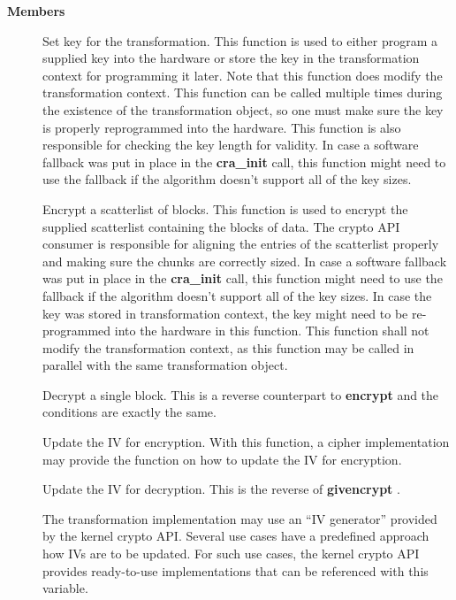 \documentclass[a4paper,8pt,english]{sphinxmanual}
\begin{document}
\textbf{Members}
\begin{description}
\item[{}] \leavevmode
Set key for the transformation. This function is used to either
program a supplied key into the hardware or store the key in the
transformation context for programming it later. Note that this
function does modify the transformation context. This function can
be called multiple times during the existence of the transformation
object, so one must make sure the key is properly reprogrammed into
the hardware. This function is also responsible for checking the key
length for validity. In case a software fallback was put in place in
the \textbf{cra\_init} call, this function might need to use the fallback if
the algorithm doesn't support all of the key sizes.

\item[{}] \leavevmode
Encrypt a scatterlist of blocks. This function is used to encrypt
the supplied scatterlist containing the blocks of data. The crypto
API consumer is responsible for aligning the entries of the
scatterlist properly and making sure the chunks are correctly
sized. In case a software fallback was put in place in the
\textbf{cra\_init} call, this function might need to use the fallback if
the algorithm doesn't support all of the key sizes. In case the
key was stored in transformation context, the key might need to be
re-programmed into the hardware in this function. This function
shall not modify the transformation context, as this function may
be called in parallel with the same transformation object.

\item[{}] \leavevmode
Decrypt a single block. This is a reverse counterpart to \textbf{encrypt}
and the conditions are exactly the same.

\item[{}] \leavevmode
Update the IV for encryption. With this function, a cipher
implementation may provide the function on how to update the IV
for encryption.

\item[{}] \leavevmode
Update the IV for decryption. This is the reverse of
\textbf{givencrypt} .

\item[{}] \leavevmode
The transformation implementation may use an ``IV generator'' provided
by the kernel crypto API. Several use cases have a predefined
approach how IVs are to be updated. For such use cases, the kernel
crypto API provides ready-to-use implementations that can be
referenced with this variable.


\end{description}
\end{document}
